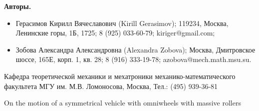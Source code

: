 {\bf Авторы.}

\begin{itemize}
    \item Герасимов Кирилл Вячеславович (Kirill Gerasimov); 119234, Москва, Ленинские горы, 1Б, 1725; 8 (925) 033-60-79; kiriger@gmail.com;
    \item Зобова Александра Александровна (Alexandra Zobova); Москва, Дмитровское шоссе, 165Е, корп. 1, кв. 28; 8 (916) 333-19-78; azobova@mech.math.msu.su.
\end{itemize}
    
    Кафедра теоретической механики и мехатроники механико-математического факультета МГУ им. М.В. Ломоносова, Москва, Тел.: (495) 939-36-81
    
    On the motion of a symmetrical vehicle with omniwheels with massive rollers
    
